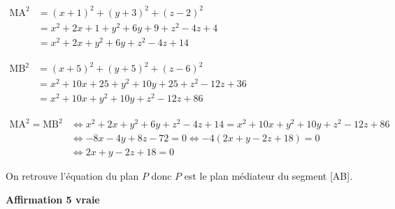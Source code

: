 \documentclass[10pt]{article}
\begin{document}
\begin{enumerate}
$\begin{aligned}
\text{MA}^2 
& = (x+1)^2+(y+3)^2 + (z-2)^2\\ 
& = x^2+2x+1 + y^2+6y+9+z^2-4z+4\\
& = x^2+2x + y^2+6y+z^2-4z+14
\end{aligned}$

$\begin{aligned}
\text{MB}^2 
& = (x+5)^2+(y+5)^2+ (z-6)^2\\
& = x^2+10x+25 + y^2+10y +25 +z^2-12z+36\\
& = x^2+10x + y^2+10y+z^2-12z+86
\end{aligned}$

$\begin{aligned}
\text{MA}^2 = \text{MB}^2
& \iff x^2+2x + y^2+6y+z^2-4z+14 = x^2+10x + y^2+10y+z^2-12z+86\\
& \iff -8x -4y + 8z -72=0
\iff -4\left ( 2x +y -2z +18\right ) = 0\\
& \iff 2x+y-2z  +18 = 0
\end{aligned}$

On retrouve l'équation du plan $P$ donc $P$ est le plan médiateur du segment [AB].

\hfill\textbf{Affirmation 5 vraie}
	\end{enumerate}
\end{document}
